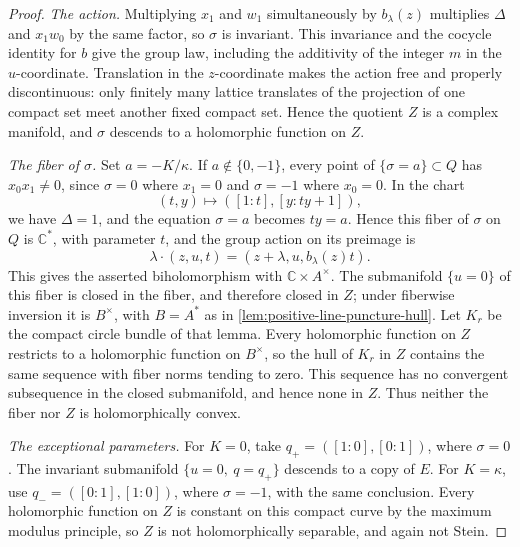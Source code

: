 \begin{proof}
\emph{The action.} Multiplying $x_1$ and $w_1$ simultaneously by $b_\lambda(z)$ multiplies $\Delta$ and $x_1w_0$ by the same factor, so $\sigma$ is invariant. This invariance and the cocycle identity for $b$ give the group law, including the additivity of the integer $m$ in the $u$-coordinate. Translation in the $z$-coordinate makes the action free and properly discontinuous: only finitely many lattice translates of the projection of one compact set meet another fixed compact set. Hence the quotient $Z$ is a complex manifold, and $\sigma$ descends to a holomorphic function on $Z$.

\emph{The fiber of $\sigma$.} Set $a=-K/\kappa$. If $a\notin\{0,-1\}$, every point of $\{\sigma=a\}\subset Q$ has $x_0x_1\ne0$, since $\sigma=0$ where $x_1=0$ and $\sigma=-1$ where $x_0=0$. In the chart
\[
 (t,y)\longmapsto([1:t],[y:ty+1]),
\]
we have $\Delta=1$, and the equation $\sigma=a$ becomes $ty=a$. Hence this fiber of $\sigma$ on $Q$ is $\mathbb C^*$, with parameter $t$, and the group action on its preimage is
\[
 \lambda\cdot(z,u,t)=(z+\lambda,u,b_\lambda(z)t).
\]
This gives the asserted biholomorphism with $\mathbb C\times A^\times$. The submanifold $\{u=0\}$ of this fiber is closed in the fiber, and therefore closed in $Z$; under fiberwise inversion it is $B^\times$, with $B=A^*$ as in \cref{lem:positive-line-puncture-hull}. Let $K_r$ be the compact circle bundle of that lemma. Every holomorphic function on $Z$ restricts to a holomorphic function on $B^\times$, so the hull of $K_r$ in $Z$ contains the same sequence with fiber norms tending to zero. This sequence has no convergent subsequence in the closed submanifold, and hence none in $Z$. Thus neither the fiber nor $Z$ is holomorphically convex.

\emph{The exceptional parameters.} For $K=0$, take $q_+=([1:0],[0:1])$, where $\sigma=0$. The invariant submanifold $\{u=0,\ q=q_+\}$ descends to a copy of $E$. For $K=\kappa$, use $q_-=([0:1],[1:0])$, where $\sigma=-1$, with the same conclusion. Every holomorphic function on $Z$ is constant on this compact curve by the maximum modulus principle, so $Z$ is not holomorphically separable, and again not Stein.


\end{proof}
